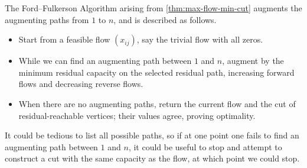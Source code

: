 \documentclass[11pt]{article}
\theoremstyle{definition}
\theoremstyle{remark}
\newcommand{\pqty}[1]{\left(#1\right)}
\begin{document}
The Ford--Fulkerson Algorithm arising from \autoref{thm:max-flow-min-cut} augments the augmenting paths from \(1\) to \(n\), and is described as follows.

\begin{itemize}
    \item Start from a feasible flow \(\pqty{x_{ij}}\), say the trivial flow with all zeros.
    \item While we can find an augmenting path between \(1\) and \(n\), augment by the minimum residual capacity on the selected residual path, increasing forward flows and decreasing reverse flows.
    \item When there are no augmenting paths, return the current flow and the cut of residual-reachable vertices; their values agree, proving optimality. 
\end{itemize}

It could be tedious to list all possible paths, so if at one point one fails to find an augmenting path between \(1\) and \(n\), it could be useful to stop and attempt to construct a cut with the same capacity as the flow, at which point we could stop.
\end{document}
